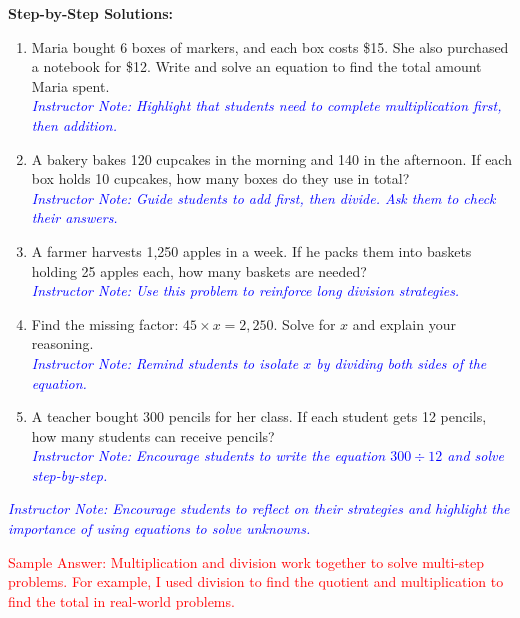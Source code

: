 \documentclass[12pt]{article}
\begin{document}
\vspace{1em}

\begin{tcolorbox}[colframe=black!60, colback=white, 
coltitle=black, colbacktitle=black!15, fonttitle=\bfseries\Large, 
title=Problems, halign title=center, left=10pt, right=10pt, top=10pt, bottom=100pt]
\textbf{Step-by-Step Solutions:}
\begin{enumerate}[start=9, itemsep=5em]
    \item Maria bought 6 boxes of markers, and each box costs \$15. She also purchased a notebook for \$12. Write and solve an equation to find the total amount Maria spent. \\
    \textcolor{blue}{\textit{Instructor Note: Highlight that students need to complete multiplication first, then addition.}}

    \item A bakery bakes 120 cupcakes in the morning and 140 in the afternoon. If each box holds 10 cupcakes, how many boxes do they use in total? \\
    \textcolor{blue}{\textit{Instructor Note: Guide students to add first, then divide. Ask them to check their answers.}}

    \item A farmer harvests 1,250 apples in a week. If he packs them into baskets holding 25 apples each, how many baskets are needed? \\
    \textcolor{blue}{\textit{Instructor Note: Use this problem to reinforce long division strategies.}}

    \item Find the missing factor: \( 45 \times x = 2,250 \). Solve for \( x \) and explain your reasoning. \\
    \textcolor{blue}{\textit{Instructor Note: Remind students to isolate \( x \) by dividing both sides of the equation.}}

    \item A teacher bought 300 pencils for her class. If each student gets 12 pencils, how many students can receive pencils? \\
    \textcolor{blue}{\textit{Instructor Note: Encourage students to write the equation \( 300 \div 12 \) and solve step-by-step.}}
\end{enumerate}
\end{tcolorbox}

\vspace{1em}

\begin{tcolorbox}[colframe=black!60, colback=white, 
coltitle=black, colbacktitle=black!15, fonttitle=\bfseries\Large, 
title=Exit Ticket, halign title=center, left=10pt, right=10pt, top=10pt, bottom=90pt]
\textcolor{blue}{\textit{Instructor Note: Encourage students to reflect on their strategies and highlight the importance of using equations to solve unknowns.}}

\textcolor{red}{
Sample Answer: Multiplication and division work together to solve multi-step problems. For example, I used division to find the quotient and multiplication to find the total in real-world problems.}
\end{tcolorbox}
\end{document}
